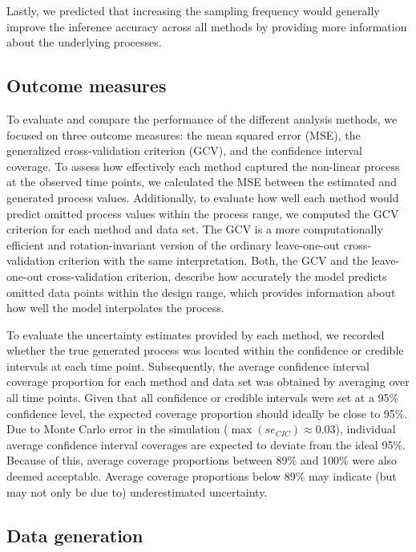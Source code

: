 \documentclass[man, floatsintext]{apa7}
\begin{document}
Lastly, we predicted that increasing the sampling frequency would generally
improve the inference accuracy across all methods by providing more information
about the underlying processes.

\subsection{Outcome measures}

To evaluate and compare the performance of the different analysis methods, we
focused on three outcome measures: the mean squared error (MSE), the
generalized cross-validation criterion (GCV), and the confidence interval
coverage. To assess how effectively each method captured the non-linear process
at the observed time points, we calculated the MSE between the estimated and
generated process values. Additionally, to evaluate how well each method would
predict omitted process values within the process range, we computed the GCV
\parencite{golub_generalized_1979} criterion for each method and data set. The
GCV is a more computationally efficient and rotation-invariant version of the
ordinary leave-one-out cross-validation criterion with the same interpretation.
Both, the GCV and the leave-one-out cross-validation criterion, describe how
accurately the model predicts omitted data points within the design range,
which provides information about how well the model interpolates the process.

To evaluate the uncertainty estimates provided by each method, we recorded
whether the true generated process was located within the confidence or
credible intervals at each time point. Subsequently, the average confidence
interval coverage proportion for each method and data set was obtained by
averaging over all time points. Given that all confidence or credible intervals
were set at a 95\% confidence level, the expected coverage proportion should
ideally be close to 95\%. Due to Monte Carlo error in the simulation
($\max(se_{CIC}) \approx 0.03$), individual average confidence interval
coverages are expected to deviate from the ideal 95\%. Because of this, average
coverage proportions between 89\% and 100\% were also deemed acceptable.
Average coverage proportions below 89\% may indicate (but may not only be due
to) underestimated uncertainty.

\subsection{Data generation}
\end{document}
